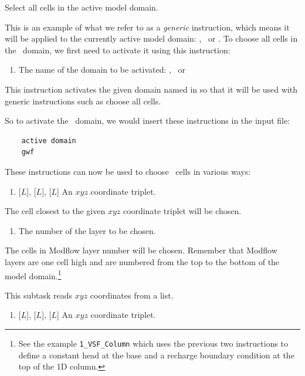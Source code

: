 {
    {Select all cells in the active model domain.
     }

  This is an example of what we refer to as a {\em generic} instruction, which means it will be applied to the currently active model domain: \gwf, \swf\ or \cln.  To choose all cells in the \gwf\ domain, we first need to activate it using this instruction:

    {
        \squish
        \begin{enumerate}
        \item {}  The name of the domain to be activated: \gwf, \swf\ or \cln\
        \end{enumerate}
        This instruction activates the given domain named in   so that it will be used with generic instructions such as \textsf{choose all cells}.
    }

So to activate the \gwf\ domain, we would insert these instructions in the input file:
\begin{verbatim}
    active domain
    gwf
\end{verbatim}

These instructions can now be used to choose \gwf\ cells in various ways\label{page:cellSelect}:

    {
        \squish
        \begin{enumerate}
        \item {} [$L$],  [$L$],  [$L$]  An $xyz$ coordinate triplet.
        \end{enumerate}
        The cell closest to the given $xyz$ coordinate triplet will be chosen.
    }

    {
        \squish
        \begin{enumerate}
        \item {}  The number of the layer to be chosen.
        \end{enumerate}
        The cells in Modflow layer number  will be chosen.  Remember that Modflow layers are one cell high and are numbered from the top to the bottom of the model domain.\footnote{ See the example \texttt{1\_VSF\_Column} which uses the previous two instructions to define a constant head at  the base  and a recharge boundary condition at the top of the 1D column.}
    }

    {This subtask reads $xyz$ coordinates from a list.
    \begin{enumerate}
        \item {} [$L$],  [$L$],  [$L$]  An $xyz$ coordinate triplet.
    \end{enumerate}

}}
